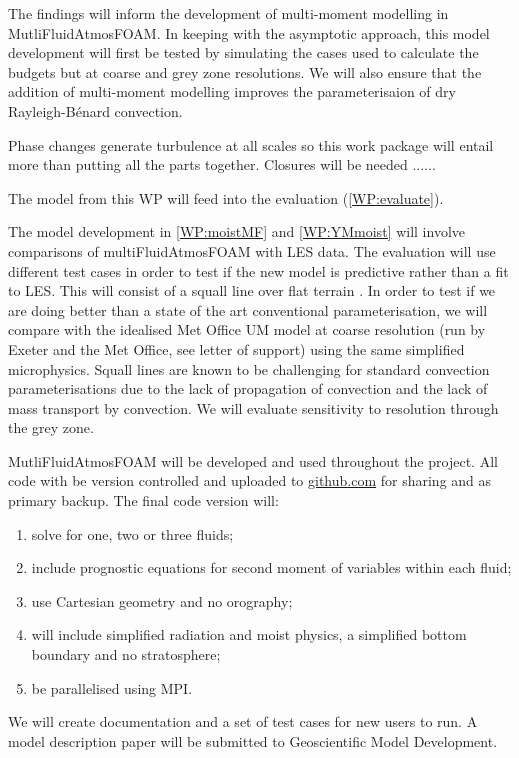 \documentclass[11pt,a4paper]{article}
\begin{document}
The findings will inform the development of multi-moment modelling in MutliFluidAtmosFOAM. In keeping with the asymptotic approach, this model development will first be tested by simulating the cases used to calculate the budgets but at coarse and grey zone resolutions. We will also ensure that the addition of multi-moment modelling improves the parameterisaion of dry Rayleigh-B\'enard convection. 


Phase changes generate turbulence at all scales so this work package will entail more than putting all the parts together. Closures will be needed ......

The model from this WP will feed into the evaluation (\ref{WP:evaluate}).


The model development in \ref{WP:moistMF} and \ref{WP:YMmoist} will involve comparisons of multiFluidAtmosFOAM with LES data. The evaluation will use different test cases in order to test if the new model is predictive rather than a fit to LES. This will consist of a squall line over flat terrain \cite[]{FM06}. In order to test if we are doing better than a state of the art conventional parameterisation, we will compare with the idealised Met Office UM model at coarse resolution (run by Exeter and the Met Office, see letter of support) using the same simplified microphysics. Squall lines are known to be challenging for standard convection parameterisations \cite[e.g.][]{LCD+08} due to the lack of propagation of convection and the lack of mass transport by convection. We will evaluate sensitivity to resolution through the grey zone. 


MutliFluidAtmosFOAM will be developed and used throughout the project. All code with be version controlled and uploaded to \url{github.com} for sharing and as primary backup. The final code version will:
\begin{enumerate}
\item solve for one, two or three fluids;
\item include prognostic equations for second moment of variables within each fluid;
\item use Cartesian geometry and no orography;
\item will include simplified radiation and moist physics, a simplified bottom boundary and no stratosphere;
\item be parallelised using MPI.
\end{enumerate}
We will create documentation and a set of test cases for new users to run. A model description paper will be submitted to Geoscientific Model Development.
\end{document}
